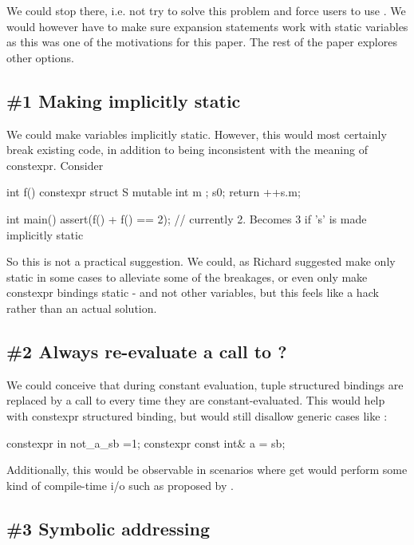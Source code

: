 \documentclass{wg21}
\begin{document}
We could stop there, i.e. not try to solve this problem and force users to use .
We would however have to make sure expansion statements work with static variables as this was one of the motivations for this paper.
The rest of the paper explores other options.

\subsection{\#1 Making  implicitly static}

We could make  variables implicitly static.
However, this would most certainly break existing code, in addition to being inconsistent with the meaning of constexpr.
Consider

\begin{colorblock}
int f() {
    constexpr struct S {
        mutable int m ;
    } s{0};
    return ++s.m;
}

int main() {
    assert(f() + f() == 2); // currently 2. Becomes 3 if 's' is made implicitly static
}
\end{colorblock}

So this is not a practical suggestion. We could, as Richard suggested
make  only static in some cases to alleviate some of the breakages, or even only make constexpr bindings static - and not other variables, but this
feels like a hack rather than an actual solution.

\subsection{\#2 Always re-evaluate a call to ?}

We could conceive that during constant evaluation, tuple structured bindings are replaced by a call to  every time they are constant-evaluated.
This would help with constexpr structured binding, but would still disallow generic cases like :

\begin{colorblock}
constexpr in not_a_sb =1;
constexpr const int&  a = sb;
\end{colorblock}

Additionally, this would be observable in scenarios where get would perform some kind of compile-time i/o such as proposed by .

\subsection{\#3 Symbolic addressing}
\end{document}
